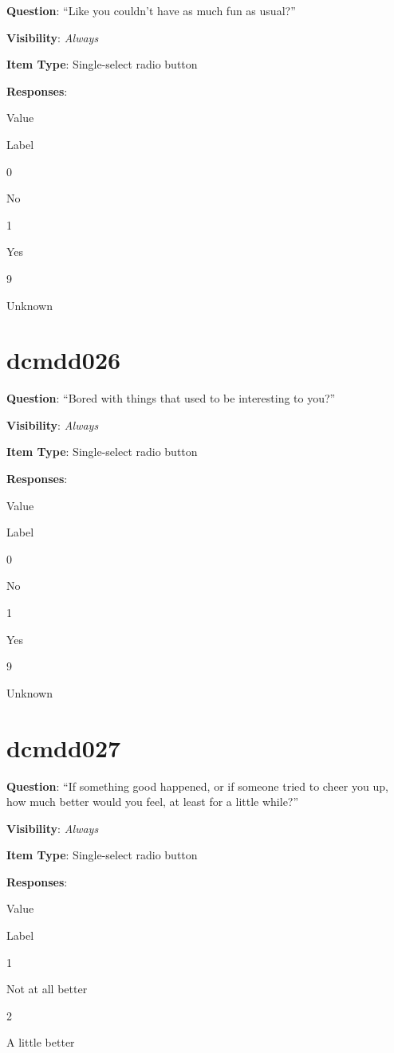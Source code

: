 \documentclass[]{book}
\begin{document}
\textbf{Question}: ``Like you couldn't have as much fun as usual?''

\textbf{Visibility}: \emph{Always}

\textbf{Item Type}: Single-select radio button

\textbf{Responses}:

Value

Label

0

No

1

Yes

9

Unknown

\hypertarget{dcmdd026}{%
\section{dcmdd026}\label{dcmdd026}}

\textbf{Question}: ``Bored with things that used to be interesting to you?''

\textbf{Visibility}: \emph{Always}

\textbf{Item Type}: Single-select radio button

\textbf{Responses}:

Value

Label

0

No

1

Yes

9

Unknown

\hypertarget{dcmdd027}{%
\section{dcmdd027}\label{dcmdd027}}

\textbf{Question}: ``If something good happened, or if someone tried to cheer you up, how much better would you feel, at least for a little while?''

\textbf{Visibility}: \emph{Always}

\textbf{Item Type}: Single-select radio button

\textbf{Responses}:

Value

Label

1

Not at all better

2

A little better
\end{document}
